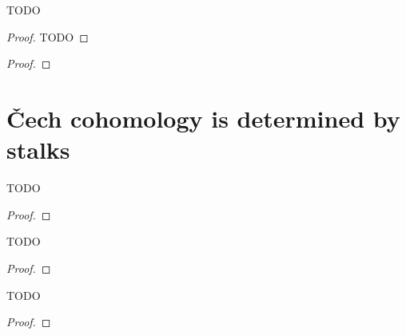 
\section{}

\begin{lemma}\label{lem:chech_preserve_quasi_iso}
    TODO
\end{lemma}

\begin{proof}
    TODO
\end{proof}

\begin{proposition}\label{prop:homotopy_k_sheaf_compute_chech}

\end{proposition}

\begin{proof}

\end{proof}

\section{\v{C}ech cohomology is determined by stalks}

\begin{lemma}\label{lem:chech_is_determined_by_stalks_1}
    TODO
\end{lemma}

\begin{proof}
\end{proof}

\begin{lemma}\label{lem:chech_is_determined_by_stalks_2}
    TODO
\end{lemma}

\begin{proof}

\end{proof}


\begin{proposition}\label{prop:chech_is_determined_by_stalks_3}
    TODO
\end{proposition}

\begin{proof}
\end{proof}